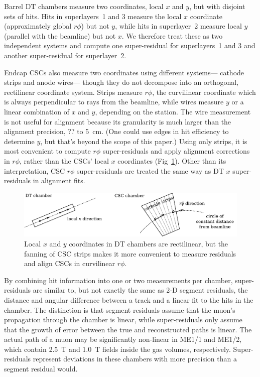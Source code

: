 \documentclass[12pt]{article}
\begin{document}
Barrel DT chambers measure two coordinates, local $x$ and $y$, but
with disjoint sets of hits.  Hits in superlayers~1 and 3 measure the
local $x$ coordinate (approximately global $r\phi$) but not $y$, while
hits in superlayer~2 measure local $y$ (parallel with the beamline)
but not $x$.  We therefore treat these as two independent systems and
compute one super-residual for superlayers~1 and 3 and another
super-residual for superlayer~2.

Endcap CSCs also measure two coordinates using different systems---
cathode strips and anode wires--- though they do not decompose into an
orthogonal, rectilinear coordinate system.  Strips measure $r\phi$,
the curvilinear coordinate which is always perpendicular to rays from
the beamline, while wires measure $y$ or a linear combination of $x$
and $y$, depending on the station.  The wire measurement is not useful
for alignment because its granularity is much larger than the
alignment precision, ?? to 5~cm.  (One could use edges in hit
efficiency to determine $y$, but that's beyond the scope of this
paper.)  Using only strips, it is most convenient to compute $r\phi$
super-residuals and apply alignment corrections in $r\phi$, rather
than the CSCs' local $x$ coordinates (Fig~\ref{fig:csc_localrphi}).
Other than its interpretation, CSC $r\phi$ super-residuals are treated
the same way as DT $x$ super-residuals in alignment fits.

\begin{figure}
\begin{center} \includegraphics{strip_direction.pdf} \end{center}
\caption{Local $x$ and $y$ coordinates in DT chambers are rectilinear, but the fanning of CSC strips makes it more convenient to measure residuals and align CSCs in curvilinear $r\phi$. \label{fig:csc_localrphi}}
\end{figure}

By combining hit information into one or two measurements per chamber,
super-residuals are similar to, but not exactly the same as 2-D
segment residuals, the distance and angular difference between a track
and a linear fit to the hits in the chamber.  The distinction is that
segment residuals assume that the muon's propagation through the
chamber is linear, while super-residuals only assume that the growth
of error between the true and reconstructed paths is linear.  The
actual path of a muon may be significantly non-linear in ME1/1 and
ME1/2, which contain 2.5~T and 1.0~T fields inside the gas volumes,
respectively.  Super-residuals represent deviations in these chambers
with more precision than a segment residual would.
\end{document}
